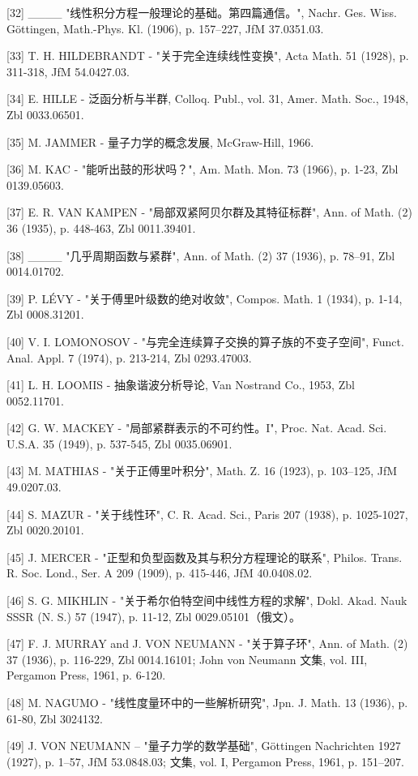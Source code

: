 {[}32{]} \_\_\_\_ "线性积分方程一般理论的基础。第四篇通信。", Nachr. Ges. Wiss. Göttingen, Math.-Phys. Kl. (1906), p. 157--227, JfM 37.0351.03.

{[}33{]} T. H. HILDEBRANDT - "关于完全连续线性变换", Acta Math. 51 (1928), p. 311-318, JfM 54.0427.03.

{[}34{]} E. HILLE - 泛函分析与半群, Colloq. Publ., vol. 31, Amer. Math. Soc., 1948, Zbl 0033.06501.

{[}35{]} M. JAMMER - 量子力学的概念发展, McGraw-Hill, 1966.

{[}36{]} M. KAC - "能听出鼓的形状吗？", Am. Math. Mon. 73 (1966), p. 1-23, Zbl 0139.05603.

{[}37{]} E. R. VAN KAMPEN - "局部双紧阿贝尔群及其特征标群", Ann. of Math. (2) 36 (1935), p. 448-463, Zbl 0011.39401.

{[}38{]} \_\_\_\_ "几乎周期函数与紧群", Ann. of Math. (2) 37 (1936), p. 78--91, Zbl 0014.01702.

{[}39{]} P. LÉVY - "关于傅里叶级数的绝对收敛", Compos. Math. 1 (1934), p. 1-14, Zbl 0008.31201.

{[}40{]} V. I. LOMONOSOV - "与完全连续算子交换的算子族的不变子空间", Funct. Anal. Appl. 7 (1974), p. 213-214, Zbl 0293.47003.

{[}41{]} L. H. LOOMIS - 抽象谐波分析导论, Van Nostrand Co., 1953, Zbl 0052.11701.

{[}42{]} G. W. MACKEY - "局部紧群表示的不可约性。I", Proc. Nat. Acad. Sci. U.S.A. 35 (1949), p. 537-545, Zbl 0035.06901.

{[}43{]} M. MATHIAS - "关于正傅里叶积分", Math. Z. 16 (1923), p. 103--125, JfM 49.0207.03.

{[}44{]} S. MAZUR - "关于线性环", C. R. Acad. Sci., Paris 207 (1938), p. 1025-1027, Zbl 0020.20101.

{[}45{]} J. MERCER - "正型和负型函数及其与积分方程理论的联系", Philos. Trans. R. Soc. Lond., Ser. A 209 (1909), p. 415-446, JfM 40.0408.02.

{[}46{]} S. G. MIKHLIN - "关于希尔伯特空间中线性方程的求解", Dokl. Akad. Nauk SSSR (N. S.) 57 (1947), p. 11-12, Zbl 0029.05101（俄文）。

{[}47{]} F. J. MURRAY and J. VON NEUMANN - "关于算子环", Ann. of Math. (2) 37 (1936), p. 116-229, Zbl 0014.16101; John von Neumann 文集, vol. III, Pergamon Press, 1961, p. 6-120.

{[}48{]} M. NAGUMO - "线性度量环中的一些解析研究", Jpn. J. Math. 13 (1936), p. 61-80, Zbl 3024132.

{[}49{]} J. VON NEUMANN -- "量子力学的数学基础", Göttingen Nachrichten 1927 (1927), p. 1--57, JfM 53.0848.03; 文集, vol. I, Pergamon Press, 1961, p. 151--207.

